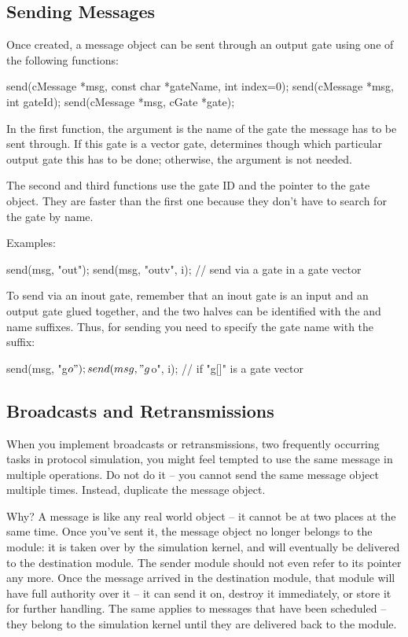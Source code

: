 \subsection{Sending Messages}

Once created, a message object can be sent through an
output gate using one of the following functions:

\begin{cpp}
send(cMessage *msg, const char *gateName, int index=0);
send(cMessage *msg, int gateId);
send(cMessage *msg, cGate *gate);
\end{cpp}

In the first function, the argument  is the name of
the gate the message has to be sent through. If this gate is
a vector gate,  determines though which particular output
gate this has to be done; otherwise, the  argument is not
needed.

The second and third functions use the gate ID and the pointer to the gate
object. They are faster than the first one because they don't have to
search for the gate by name.

Examples:

\begin{cpp}
send(msg, "out");
send(msg, "outv", i); // send via a gate in a gate vector
\end{cpp}

To send via an inout gate, remember that an inout gate is an input and an
output gate glued together, and the two halves can be identified with the
 and  name suffixes. Thus, for sending you need to specify
the gate name with the  suffix:

\begin{cpp}
send(msg, "g$o");
send(msg, "g$o", i); // if "g[]" is a gate vector
\end{cpp}


\subsection{Broadcasts and Retransmissions}

When you implement broadcasts or retransmissions, two frequently
occurring tasks in protocol simulation, you might feel tempted
to use the same message in multiple  operations.
Do not do it -- you cannot send the same message object multiple times.
Instead, duplicate the message object.

Why? A message is like any real world object -- it cannot be at two places
at the same time. Once you've sent it, the message object no longer belongs
to the module: it is taken over by the simulation kernel, and will
eventually be delivered to the destination module. The sender module should
not even refer to its pointer any more. Once the message arrived in the
destination module, that module will have full authority over it -- it can
send it on, destroy it immediately, or store it for further handling. The
same applies to messages that have been scheduled -- they belong to the
simulation kernel until they are delivered back to the module.

